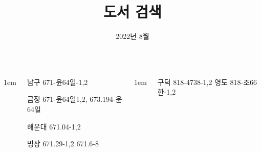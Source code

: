 \documentclass[	20pt, 
							a1paper, 
							portrait, %
							margin=0mm, %
							innermargin=10mm,  		%
							colspace=5mm, 
							subcolspace=0mm
							]{tikzposter}
\title{도서 검색}
\author{ 2022년 8월 }
\begin{document}
	\maketitle

	\begin{columns}



			{
					\setlength{\leftmargini}{7em}
					\setlength{\labelsep} {1em}
				\begin{LARGE}
남구 671-윤64일-1,2

금정 671-윤64일1,2,  673.194-윤64일

해운대  671.04-1,2    

명장    671.29-1,2   671.6-8
				\end{LARGE}
			}



			{
					\setlength{\leftmargini}{7em}
					\setlength{\labelsep} {1em}
				\begin{LARGE}
구덕    818-4738-1,2   	%
영도    818-조66한-1,2 	%


\end{LARGE}}
\end{columns}
\end{document}
